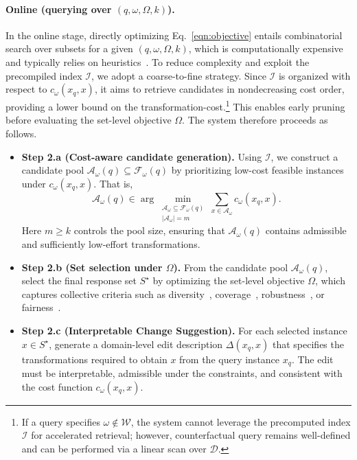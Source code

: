 \paragraph{Online (querying over $(q,\omega,\Omega,k)$).}
In the online stage, directly optimizing Eq.~\eqref{eqn:objective} entails combinatorial search over subsets for a given $(q,\omega,\Omega,k)$, which is computationally expensive and typically relies on heuristics~\cite{qin2009keyword,roy2014fast,yang2016fast}. To reduce complexity and exploit the precompiled index $\mathcal I$, we adopt a coarse-to-fine strategy. Since $\mathcal I$ is organized with respect to $c_\omega(x_q,x)$, it aims to retrieve candidates in nondecreasing cost order, providing a lower bound on the transformation-cost.\footnote{If a query specifies $\omega \notin \mathcal W$, the system cannot leverage the precomputed index $\mathcal I$ for accelerated retrieval; however, counterfactual query remains well-defined and can be performed via a linear scan over $\mathcal D$.}  This enables early pruning before evaluating the set-level objective $\Omega$. The system therefore proceeds as follows.
\begin{itemize}
    \item \textbf{Step 2.a (Cost-aware candidate generation).} Using $\mathcal I$, we construct a candidate pool $\mathcal A_\omega(q)\subseteq \mathcal F_\omega(q)$ by prioritizing low-cost feasible instances under $c_\omega(x_q,x)$. That is,
    \begingroup\small
    \begin{equation}
    \mathcal A_\omega(q) 
    \in 
    \arg\min_{\substack{\mathcal A_\omega \subseteq \mathcal F_\omega(q)\\ |\mathcal A_\omega|=m}}
    \sum_{x\in \mathcal A_\omega} c_\omega(x_q,x).
    \end{equation}
    \endgroup
    Here $m \ge k$ controls the pool size, ensuring that $\mathcal A_\omega(q)$ contains admissible and sufficiently low-effort transformations.
    \item \textbf{Step 2.b (Set selection under $\Omega$).} From the candidate pool $\mathcal A_\omega(q)$, select the final response set $S^\star$ by optimizing the set-level objective $\Omega$, which captures collective criteria such as diversity~\cite{laugel2023achieving}, coverage~\cite{wen2025enhancing}, robustness~\cite{guyomard2023generating}, or fairness~\cite{kusner2017counterfactual}.
    \item \textbf{Step 2.c (Interpretable Change Suggestion).} For each selected instance $x \in S^\star$, generate a domain-level edit description $\Delta(x_q, x)$ that specifies the transformations required to obtain $x$ from the query instance $x_q$. The edit must be interpretable, admissible under the constraints, and consistent with the cost function $c_\omega(x_q, x)$. 
\end{itemize}

